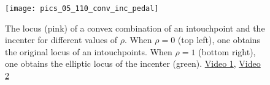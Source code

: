 \begin{figure}
    \centering
    \texttt{[image: pics\_05\_110\_conv\_inc\_pedal]}
    \caption{The locus (pink) of a convex combination of an intouchpoint and the incenter for different values of $\rho$. When $\rho=0$ (top left), one obtains the original locus of an intouchpoints. When $\rho=1$ (bottom right), one obtains the elliptic locus of the incenter (green). \href{https://youtu.be/3Gr3Nh5-jHs}{Video 1}, \href{https://youtu.be/HZFjkWD_CnE}{Video 2}}
    \label{fig:05-inc-wind3}
\end{figure}
